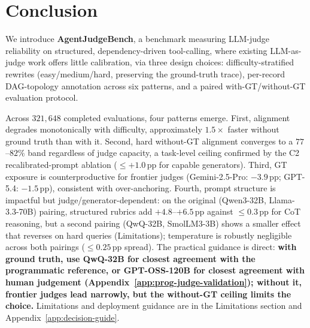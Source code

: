 \section{Conclusion}
\label{sec:conclusion}
We introduce \textbf{AgentJudgeBench}, a benchmark measuring LLM-judge reliability on structured, dependency-driven tool-calling, where existing LLM-as-judge work offers little calibration, via three design choices: difficulty-stratified rewrites (easy/medium/hard, preserving the ground-truth trace), per-record DAG-topology annotation across six patterns, and a paired with-GT/without-GT evaluation protocol.

Across $321{,}648$ completed evaluations, four patterns emerge. First, alignment degrades monotonically with difficulty, approximately $1.5\times$ faster without ground truth than with it. Second, hard without-GT alignment converges to a $77$--$82\%$ band regardless of judge capacity, a task-level ceiling confirmed by the C2 recalibrated-prompt ablation (${\leq}{+1.0}$\,pp for capable generators). Third, GT exposure is counterproductive for frontier judges (Gemini-2.5-Pro: $-3.9$\,pp; GPT-5.4: $-1.5$\,pp), consistent with over-anchoring. Fourth, prompt structure is impactful but judge/generator-dependent: on the original (Qwen3-32B, Llama-3.3-70B) pairing, structured rubrics add $+4.8$--$+6.5$\,pp against ${\leq}0.3$\,pp for CoT reasoning, but a second pairing (QwQ-32B, SmolLM3-3B) shows a smaller effect that reverses on hard queries (Limitations); temperature is robustly negligible across both pairings (${\leq}0.25$\,pp spread). The practical guidance is direct: \textbf{with ground truth, use QwQ-32B for closest agreement with the programmatic reference, or GPT-OSS-120B for closest agreement with human judgement (Appendix~\ref{app:prog-judge-validation}); without it, frontier judges lead narrowly, but the without-GT ceiling limits the choice.} Limitations and deployment guidance are in the Limitations section and Appendix~\ref{app:decision-guide}.